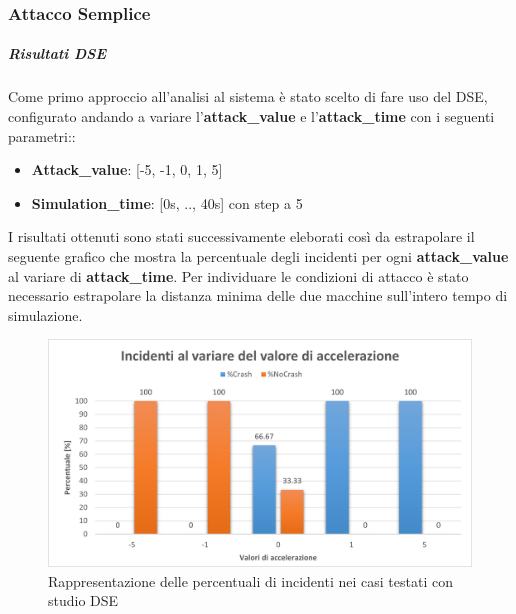 \subsubsection{Attacco Semplice}
\subparagraph{Risultati DSE}
Come primo approccio all'analisi al sistema è stato scelto di fare uso del DSE, configurato andando a variare l'\textbf{attack\_value} e l'\textbf{attack\_time} con i seguenti parametri::
\begin{itemize}
	\item \textbf{Attack\_value}: [-5, -1, 0, 1, 5]
	\item \textbf{Simulation\_time}: [0s, .., 40s] con step a 5
\end{itemize}
I risultati ottenuti sono stati successivamente eleborati così da estrapolare il seguente grafico che mostra la percentuale degli incidenti per ogni \textbf{attack\_value} al variare di \textbf{attack\_time}. Per individuare le condizioni di attacco è stato necessario estrapolare la distanza minima delle due macchine sull'intero tempo di simulazione.

\begin{figure}[H]
	\centering
	\includegraphics[width=\textwidth]{img/PlotPercentageIncidenteAttackAccel.png}
	\caption{Rappresentazione delle percentuali di incidenti nei casi testati con studio DSE}
\end{figure}


